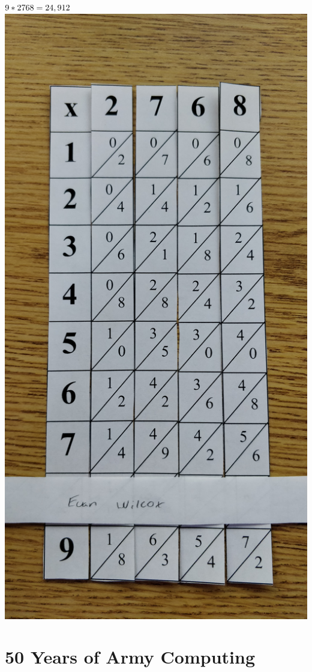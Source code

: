 \documentclass[a4paper]{article}
\begin{document}
    $9 * 2768 = 24,912 \\$
    \includegraphics[scale=0.08]{3}

    \section{50 Years of Army Computing}
\end{document}
